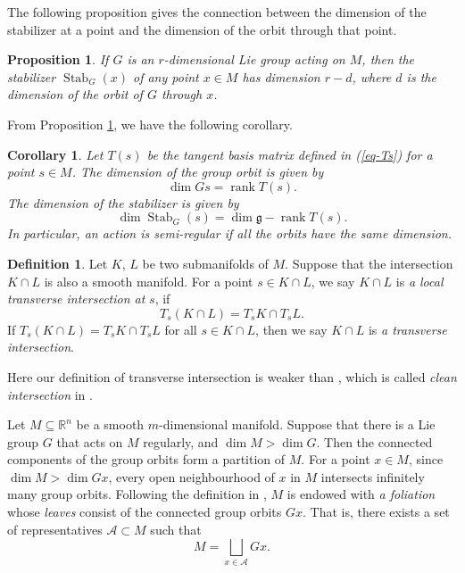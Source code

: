 \documentclass[reqno]{amsart}
\newtheorem{corollary}[theorem]{Corollary}
\newtheorem{proposition}[theorem]{Proposition}
\theoremstyle{definition}
\newtheorem{definition}[theorem]{Definition}
\numberwithin{equation}{section}
\theoremstyle{remark}
\begin{document}
The following proposition gives the connection between the dimension of the stabilizer at a point and the dimension of the orbit through that point.
\begin{proposition}\cite[Prop.2.67]{olver95e}\label{prop-dimstab}
If $G$ is an $r$-dimensional Lie group acting on $M$, then the stabilizer $\operatorname{Stab}_G(x)$ of any point $x \in M$ has dimension $r-d$, where $d$ is the dimension of the orbit of $G$ through $x$.
\end{proposition}

From Proposition \ref{prop-dimstab}, we have the following corollary.
\begin{corollary}\label{cor-dimos}
Let $T(s)$ be the tangent basis matrix defined in (\ref{eq-Ts}) for a point $s\in M$. The dimension of the group orbit is given by 
$$\dim Gs= \operatorname{rank}T(s).$$
The dimension of the stabilizer is given by
$$\dim \operatorname{Stab}_G(s)=\dim \mathfrak{g}-\operatorname{rank}T(s).$$
In particular, an action is semi-regular if all the orbits have the same dimension.
\end{corollary}

\begin{definition}\label{def-tranint}
Let $K$, $L$ be two submanifolds of $M$. Suppose that the intersection $K\cap L$ is also a smooth manifold. For a point $s\in K\cap L$, we say $K\cap L$ is \emph{a local transverse intersection at} $s$, if
 $$T_s (K\cap L)=T_s K\cap T_s L.$$
If $T_s (K\cap L)=T_s K\cap T_s L$ for all $s\in K\cap L$, then we say $K\cap L$ is \emph{a transverse intersection}. 
\end{definition}
Here our definition of transverse intersection is weaker than \cite{lee12smooth}, which is called \emph{clean intersection} in \cite[Append. C.3]{Hor85III}.

Let $M\subseteq \mathbb{R}^n$ be a smooth $m$-dimensional manifold. Suppose that there is a Lie group $G$ that acts on $M$ regularly, and $\dim M>\dim G$. Then the connected components of the group orbits form a
partition of $M$. For a point $x\in M$, since $\dim M>\dim Gx$, every open neighbourhood of $x$ in $M$ intersects infinitely many group orbits.
Following the definition in \cite{lawson74fol,lee12smooth}, $M$ is endowed with \emph{a foliation}  whose \emph{leaves} consist of the connected group orbits $Gx$. That is, there exists a set of representatives $\mathcal{A}\subset M$ such that
\begin{equation*}
M=\bigsqcup_{x\in \mathcal{A}} Gx.
\end{equation*}
\end{document}
